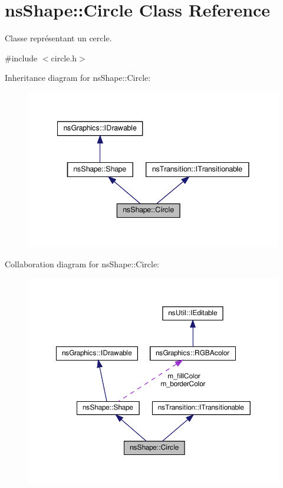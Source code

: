 \hypertarget{classns_shape_1_1_circle}{}\section{ns\+Shape\+:\+:Circle Class Reference}
\label{classns_shape_1_1_circle}


Classe représentant un cercle.  




{\ttfamily \#include $<$circle.\+h$>$}



Inheritance diagram for ns\+Shape\+:\+:Circle\+:
\nopagebreak
\begin{figure}[H]
\begin{center}
\leavevmode
\includegraphics[width=341pt]{classns_shape_1_1_circle__inherit__graph}
\end{center}
\end{figure}


Collaboration diagram for ns\+Shape\+:\+:Circle\+:
\nopagebreak
\begin{figure}[H]
\begin{center}
\leavevmode
\includegraphics[width=350pt]{classns_shape_1_1_circle__coll__graph}
\end{center}
\end{figure}
